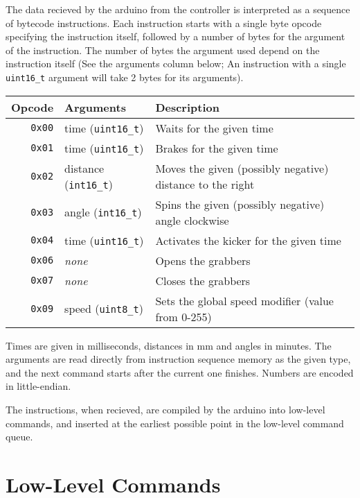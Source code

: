 \documentclass[a4paper]{scrartcl}
\begin{document}
The data recieved by the arduino from the controller is interpreted as a
sequence of bytecode instructions. Each instruction starts with a single byte
opcode specifying the instruction itself, followed by a number of bytes for the
argument of the instruction. The number of bytes the argument used depend on
the instruction itself (See the arguments column below; An instruction with a
single \verb$uint16_t$ argument will take 2 bytes for its arguments).

\begin{tabularx}{\textwidth}{rlX}
    Opcode & Arguments & Description \\
    \hline
    \texttt{0x00} & time (\verb$uint16_t$) &
        Waits for the given time \\
    \texttt{0x01} & time (\verb$uint16_t$) &
        Brakes for the given time \\
    \texttt{0x02} & distance (\verb$int16_t$) &
        Moves the given (possibly negative) distance to the right \\
    \texttt{0x03} & angle (\verb$int16_t$) &
        Spins the given (possibly negative) angle clockwise \\
    \texttt{0x04} & time (\verb$uint16_t$) &
        Activates the kicker for the given time \\
    \texttt{0x06} & \textit{none} &
        Opens the grabbers \\
    \texttt{0x07} & \textit{none} &
        Closes the grabbers \\
    \texttt{0x09} & speed (\verb$uint8_t$) &
        Sets the global speed modifier (value from 0-255) \\
\end{tabularx}

Times are given in milliseconds, distances in mm and angles in minutes.  The
arguments are read directly from instruction sequence memory as the given type,
and the next command starts after the current one finishes. Numbers are encoded
in little-endian.

The instructions, when recieved, are compiled by the arduino into low-level
commands, and inserted at the earliest possible point in the low-level command
queue.

\section{Low-Level Commands}
\end{document}
